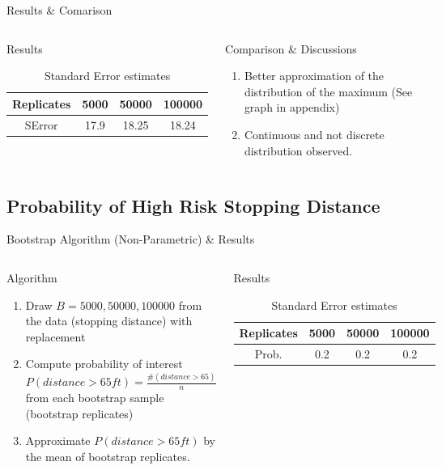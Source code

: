 \documentclass[a4paper,9pt]{beamer}\usepackage[]{graphicx}\usepackage[]{color}
\begin{document}
\begin{frame}{Results \& Comarison}


\begin{columns}
\begin{block}{Results}
\begin{table}[h]
\begin{tabular}{cccc}
\hline
Replicates & 5000 & 50000 & 100000\\ 
\hline
SError & 17.9 & 18.25 & 18.24\\
\hline
\end{tabular}
\caption{Standard Error estimates}
\end{table}
\end{block}

\begin{block}{Comparison \& Discussions}
\begin{enumerate}[i]
\item Better approximation of the distribution of the maximum (\alert{See graph in appendix})
\item Continuous and not discrete distribution observed.
\end{enumerate}
\end{block}
\end{columns}
\end{frame}

\subsection{Probability of High Risk Stopping Distance}
\begin{frame}{Bootstrap Algorithm (Non-Parametric) \& Results}

\begin{columns}
\begin{block}{Algorithm}
\begin{enumerate}[i]
 \item Draw $B=5000, 50000, 100000$ from the data (stopping distance) with replacement
 \item Compute probability of interest $P(distance > 65ft) = \frac{\#(distance > 65)}{n}$ from each bootstrap sample (bootstrap replicates)
 \item Approximate $P(distance > 65ft)$ by the mean of bootstrap replicates.
 \end{enumerate}
 \end{block}
 
 \begin{block}{Results}
 \begin{table}[h]
\begin{tabular}{cccc}
\hline
Replicates & 5000 & 50000 & 100000\\ 
\hline
Prob. & 0.2 & 0.2 & 0.2\\
\hline
\end{tabular}
\caption{Standard Error estimates}
\end{table}

 \end{block}
\end{columns}
\end{frame}
\end{document}
